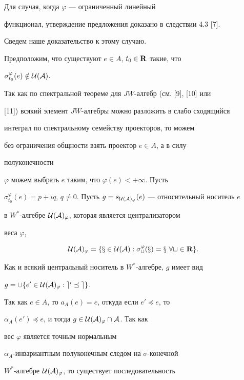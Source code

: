 \begin{pf} 


Для случая, когда $\varphi$ --- ограниченный линейный 


функционал, утверждение предложения доказано в следствии 4.3 [7]. 


Сведем наше доказательство к этому случаю. 


 


Предположим, что существуют $e\in A$, $t_0\in\bold R$ такие, что 


$\sigma^\varphi_{t_0}(e)\notin\cal U(A)$. 


Так как по спектральной теореме для $JW$-алгебр (см. [9], [10] или 


[11]) всякий элемент $JW$-алгебры можно разложить в слабо сходящийся 


интеграл по спектральному семейству проекторов, то можем 


без ограничения общности взять проектор $e\in A$, а в силу 


полуконечности 


$\varphi$ можем выбрать $e$ таким, что $\varphi(e)<+\infty$. Пусть 


$\sigma^\varphi_{t_0}(e)=p+i{}q$, $q\ne0$. Пусть $g=s_{\cal 


U(A)_\varphi}(e)$ --- относительный носитель $e$ 


в $W^*$-алгебре $\cal U(A)_\varphi$, которая является централизатором 


веса $\varphi$, 


$$ 


\cal U(A)_\varphi=\{x\in\cal U(A):\sigma^\varphi_t(x)= 


x\ \forall t\in\bold R\}. 


$$ 


Как и всякий центральный носитель в $W^*$-алгебре, $g$ имеет вид 


$g=\cup\{e'\in\cal U(A)_\varphi:e'\preceq e\}$. 


Так как $e\in A$, то $a_A(e)=e$, откуда если $e'\preceq e$, то 


$\alpha_A(e')\preceq e$, и тогда $g\in\cal U(A)_\varphi\cap A$. Так как 


вес $\varphi$ является точным нормальным 


$\alpha_A$-инвариантным полуконечным следом на $\sigma$-конечной 


$W^*$-алгебре $\cal U(A)_\varphi$, то существует последовательность 



\end{pf}
